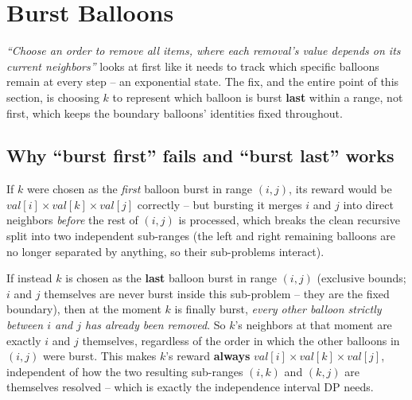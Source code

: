 \section{Burst Balloons}
\label{sec:dp-burst-balloons}


\begin{patternbox}
\emph{``Choose an order to remove all items, where each removal's value
depends on its current neighbors''} looks at first like it needs to
track which specific balloons remain at every step -- an exponential
state. The fix, and the entire point of this section, is choosing $k$
to represent which balloon is burst \textbf{last} within a range, not
first, which keeps the boundary balloons' identities fixed throughout.
\end{patternbox}

\subsection*{Why ``burst first'' fails and ``burst last'' works}

If $k$ were chosen as the \emph{first} balloon burst in range $(i,j)$,
its reward would be $\textit{val}[i]\times\textit{val}[k]\times
\textit{val}[j]$ correctly -- but bursting it merges $i$ and $j$ into
direct neighbors \emph{before} the rest of $(i,j)$ is processed, which
breaks the clean recursive split into two independent sub-ranges (the
left and right remaining balloons are no longer separated by anything,
so their sub-problems interact).

If instead $k$ is chosen as the \textbf{last} balloon burst in range
$(i,j)$ (exclusive bounds; $i$ and $j$ themselves are never burst
inside this sub-problem -- they are the fixed boundary), then at the
moment $k$ is finally burst, \emph{every other balloon strictly between
$i$ and $j$ has already been removed}. So $k$'s neighbors at that
moment are exactly $i$ and $j$ themselves, regardless of the order in
which the other balloons in $(i,j)$ were burst. This makes $k$'s reward
\textbf{always} $\textit{val}[i]\times\textit{val}[k]\times
\textit{val}[j]$, independent of how the two resulting sub-ranges
$(i,k)$ and $(k,j)$ are themselves resolved -- which is exactly the
independence interval DP needs.

